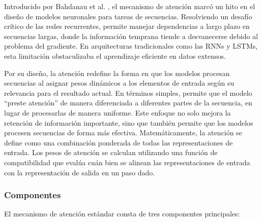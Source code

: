 Introducido por Bahdanau et al. \cite{bahdanau2014neural}, el mecanismo de atención marcó un hito en el diseño de modelos neuronales para tareas de secuencias. Resolviendo un desafío crítico de las redes recurrentes, permite manejar dependencias a largo plazo en secuencias largas, donde la información temprana tiende a desvanecerse debido al problema del gradiente. En arquitecturas tradicionales como las RNNs y LSTMs, esta limitación obstaculizaba el aprendizaje eficiente en datos extensos.

Por su diseño, la atención redefine la forma en que los modelos procesan secuencias al asignar pesos dinámicos a los elementos de entrada según su relevancia para el resultado actual. En términos simples, permite que el modelo ``preste atención'' de manera diferenciada a diferentes partes de la secuencia, en lugar de procesarlas de manera uniforme. Este enfoque no solo mejora la retención de información importante, sino que también permite que los modelos procesen secuencias de forma más efectiva. Matemáticamente, la atención se define como una combinación ponderada de todas las representaciones de entrada. Los pesos de atención se calculan utilizando una función de compatibilidad que evalúa cuán bien se alinean las representaciones de entrada con la representación de salida en un paso dado.

\subsubsection*{Componentes}

El mecanismo de atención estándar consta de tres componentes principales:

